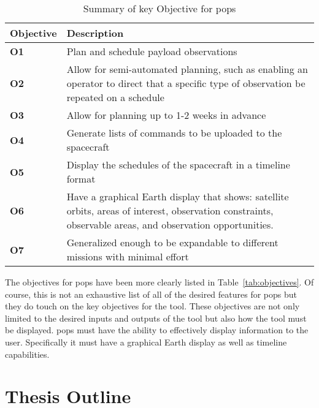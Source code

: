 \begin{table}[h]
    \centering
    \caption{Summary of key Objective for \gls{pops}}
    \label{objectives}
    \begin{tabular}{|P{0.11\textwidth}|p{0.8\textwidth}|}
\hline
    \textbf{Objective} & \textbf{Description} \\ \hline
    \textbf{O1} &  Plan and schedule payload observations          \\ \hline
    \textbf{O2} &  Allow for semi-automated planning, such as enabling an operator to direct that a specific type of observation be repeated on a schedule           \\ \hline
    \textbf{O3} & Allow for planning up to 1-2 weeks in advance  \\ \hline
    \textbf{O4} & Generate lists of commands to be uploaded to the spacecraft          \\ \hline
    \textbf{O5} &  Display the schedules of the spacecraft in a timeline format   \\ \hline
    \textbf{O6} & Have a graphical Earth display that shows: satellite orbits, areas of interest, observation constraints, observable areas, and observation opportunities. \\ \hline
    \textbf{O7} & Generalized enough to be expandable to different missions with minimal effort  \\ \hline
\end{tabular}
\end{table}

The objectives for \gls{pops} have been more clearly listed in
Table~\ref{tab:objectives}. Of course, this is not an exhaustive list of all of
the desired features for \gls{pops} but they do touch on the key objectives for
the tool. These objectives are not only limited to the desired inputs and
outputs of the tool but also how the tool must be displayed. \gls{pops} must
have the ability to effectively display information to the user. Specifically
it must have a graphical Earth display as well as timeline capabilities.


\section{Thesis Outline} 

